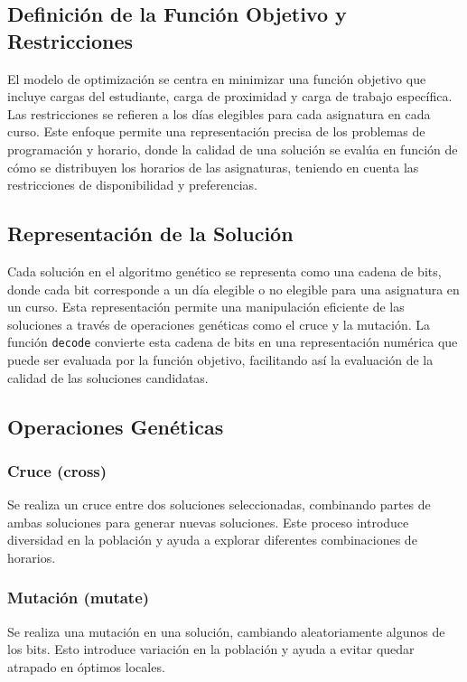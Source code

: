 \documentclass{article}
\begin{document}
\subsection{Definición de la Función Objetivo y Restricciones}

El modelo de optimización se centra en minimizar una función objetivo que incluye cargas del estudiante, carga de proximidad y carga de trabajo específica. Las restricciones se refieren a los días elegibles para cada asignatura en cada curso. Este enfoque permite una representación precisa de los problemas de programación y horario, donde la calidad de una solución se evalúa en función de cómo se distribuyen los horarios de las asignaturas, teniendo en cuenta las restricciones de disponibilidad y preferencias.

\subsection{Representación de la Solución}

Cada solución en el algoritmo genético se representa como una cadena de bits, donde cada bit corresponde a un día elegible o no elegible para una asignatura en un curso. Esta representación permite una manipulación eficiente de las soluciones a través de operaciones genéticas como el cruce y la mutación. La función \texttt{decode} convierte esta cadena de bits en una representación numérica que puede ser evaluada por la función objetivo, facilitando así la evaluación de la calidad de las soluciones candidatas.

\subsection{Operaciones Genéticas}

\subsubsection{Cruce (cross)}

Se realiza un cruce entre dos soluciones seleccionadas, combinando partes de ambas soluciones para generar nuevas soluciones. Este proceso introduce diversidad en la población y ayuda a explorar diferentes combinaciones de horarios.

\subsubsection{Mutación (mutate)}

Se realiza una mutación en una solución, cambiando aleatoriamente algunos de los bits. Esto introduce variación en la población y ayuda a evitar quedar atrapado en óptimos locales.
\end{document}
